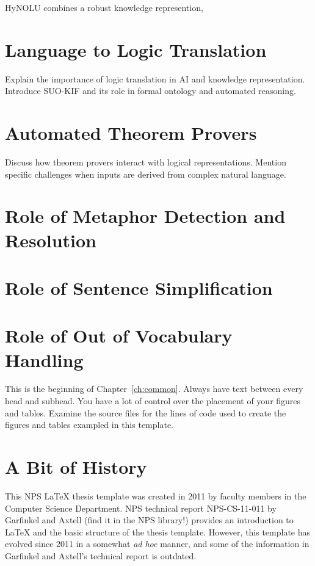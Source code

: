 HyNOLU combines a robust knowledge represention, 

\section{Language to Logic Translation}
Explain the importance of logic translation in AI and knowledge representation. Introduce SUO-KIF and its role in formal ontology and automated reasoning.





\section{Automated Theorem Provers}
Discuss how theorem provers interact with logical representations. Mention specific challenges when inputs are derived from complex natural language.

\section{Role of Metaphor Detection and Resolution}

\section{Role of Sentence Simplification}

\section{Role of Out of Vocabulary Handling}
This is the beginning of Chapter~\ref{ch:common}. 
Always have text between every head and subhead. You have a lot of control over the placement of your figures and tables. Examine the source files for the lines of code used to create the figures and tables exampled in this template. 

\section{A Bit of History}

This NPS \LaTeX{} thesis template was created in 2011 by faculty members in the Computer Science Department. NPS technical report NPS-CS-11-011 by Garfinkel and Axtell (find it in the NPS library!) provides an introduction to \LaTeX{} and the basic structure of the thesis template. However, this template has evolved since 2011 in a somewhat {\it ad hoc} manner, and some of the information in Garfinkel and Axtell's technical report is outdated.

